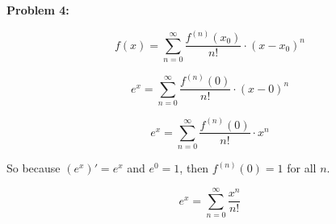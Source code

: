 \textbf{Problem 4:}

\singlespacing

\[ f(x) = \sum_{n=0}^{\infty} \frac{f^{(n)}(x_0)}{n!}\cdot(x - x_0)^n \]

\[ e^x = \sum_{n=0}^{\infty} \frac{f^{(n)}(0)}{n!}\cdot(x - 0)^n \]

\[ e^x = \sum_{n=0}^{\infty} \frac{f^{(n)}(0)}{n!}\cdot x^n \]

\singlespacing

\begin{center}
    So because $(e^x)' = e^x$ and $e^0 = 1$, then $f^{(n)}(0) = 1$ for all $n$.
\end{center}

\[ e^x = \sum_{n=0}^{\infty} \frac{x^n}{n!} \]